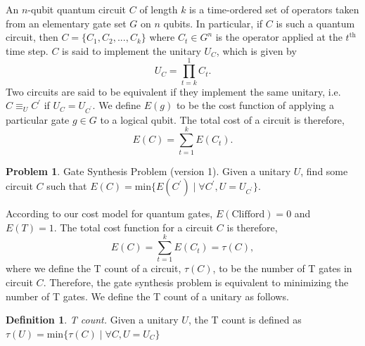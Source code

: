 \documentclass{article}
\theoremstyle{definition}
\newtheorem{definition}{Definition}[section]
\theoremstyle{problem}
\newtheorem{problem}{Problem}[section]
\theoremstyle{lemma}
\begin{document}
	An $n$-qubit quantum circuit $C$ of length $k$ is a time-ordered set of operators taken from an elementary gate set $G$ on $n$ qubits. In particular, if $C$ is such a quantum circuit, then $C = \{C_1,C_2,...,C_k\}$ where $C_t\in G^n$ is the operator applied at the $t^\text{th}$ time step.
	$C$ is said to implement the unitary $U_C$, which is given by
	\begin{equation}
	U_C = \prod_{t = k}^1 C_t.
	\end{equation}
	Two circuits are said to be equivalent if they implement the same unitary, i.e. $C \equiv_U C^\prime$ if $U_C = U_{C^\prime}$. We define $E(g)$ to be the cost function of applying a particular gate $g\in G$ to a logical qubit. The total cost of a circuit is therefore,
	\begin{equation}
	\label{e_Cost}
	E(C) = \sum_{t=1}^k E(C_t).
	\end{equation}
	
	
	
	\theoremstyle{problem}
	\begin{problem}{Gate Synthesis Problem (version 1).}
		\label{p_gsp1}
		Given a unitary $U$, find some circuit $C$ such that $E(C) = \text{min}\{E(C^\prime) \mid \forall C^\prime,U=U_{C^\prime}\}$.
	\end{problem}
	
	According to our cost model for quantum gates, $E(\text{Clifford}) = 0$ and $E(T)=1$. The total cost function for a circuit $C$ is therefore,
	\begin{equation}
	E(C) = \sum_{t=1}^k E(C_t) = \tau(C),
	\end{equation}
	where we define the T count of a circuit, $\tau(C)$, to be the number of T gates in circuit $C$. Therefore, the gate synthesis problem is equivalent to minimizing the number of T gates. We define the T count of a unitary as follows.
	
	\theoremstyle{definition}
	\begin{definition}{\emph{T count.}}
		Given a unitary $U$, the T count is defined as $\tau(U) = \text{min}\{\tau(C) \mid \forall C, U = U_C\}$
	\end{definition}
	
	\FloatBarrier
\end{document}
